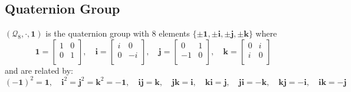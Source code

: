 \documentclass[a4paper]{article}
\begin{document}
\subsection*{Quaternion Group}
\begin{defi}
$(\mathcal{Q}_8,\cdot,\boldsymbol{1})$ is the quaternion group with 8 elements $\{\pm\boldsymbol{1},\pm \boldsymbol{i},\pm \boldsymbol{j},\pm \boldsymbol{k}\}$ where
$$\boldsymbol{1}=\begin{bmatrix}1&0\\0&1\\\end{bmatrix},\quad \boldsymbol{i}=\begin{bmatrix}i&0\\0&-i\\\end{bmatrix},\quad \boldsymbol{j}=\begin{bmatrix}0&1\\-1&0\\\end{bmatrix},\quad \boldsymbol{k}=\begin{bmatrix}0&i\\i&0\\\end{bmatrix}$$
and are related by:
$$(-\boldsymbol{1})^2=\boldsymbol{1},\quad \boldsymbol{i}^2=\boldsymbol{j}^2=\boldsymbol{k}^2=-\boldsymbol{1},\quad \boldsymbol{ij}=\boldsymbol{k},\quad \boldsymbol{jk}=\boldsymbol{i},\quad \boldsymbol{ki}=\boldsymbol{j},\quad \boldsymbol{ji}=-\boldsymbol{k},\quad \boldsymbol{kj}=-\boldsymbol{i},\quad \boldsymbol{ik}=-\boldsymbol{j}$$
\end{defi}
\newpage
\end{document}
